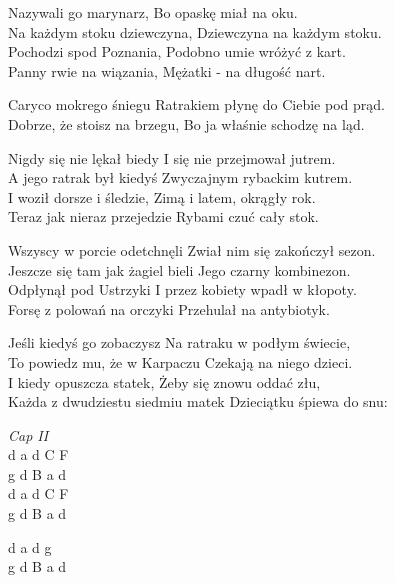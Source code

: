 \begin{text}
    \ifOneCol \else \footnotesize{ \fi
    \ifchorded{\hfill\break}
    Nazywali go marynarz, Bo opaskę miał na oku.\\
    Na każdym stoku dziewczyna,  Dziewczyna na każdym stoku.\\
    Pochodzi spod Poznania, Podobno umie wróżyć z kart.\\
    Panny rwie na wiązania, Mężatki - na długość nart.

    Caryco mokrego śniegu Ratrakiem płynę do Ciebie pod prąd.\\
    Dobrze, że stoisz na brzegu, Bo ja właśnie schodzę na ląd.

    Nigdy się nie lękał biedy I się nie przejmował jutrem.\\
    A jego ratrak był kiedyś Zwyczajnym rybackim kutrem.\\
    I woził dorsze i śledzie, Zimą i latem, okrągły rok.\\
    Teraz jak nieraz przejedzie Rybami czuć cały stok.

    Wszyscy w porcie odetchnęli Zwiał nim się zakończył sezon.\\
    Jeszcze się tam jak żagiel bieli Jego czarny kombinezon.\\
    Odpłynął pod Ustrzyki I przez kobiety wpadł w kłopoty.\\
    Forsę z polowań na orczyki Przehulał na antybiotyk.

    Jeśli kiedyś go zobaczysz Na ratraku w podłym świecie,\\
    To powiedz mu, że w Karpaczu Czekają na niego dzieci.\\
    I kiedy opuszcza statek, Żeby się znowu oddać złu,\\
    Każda z dwudziestu siedmiu matek Dzieciątku śpiewa do snu:
    \ifOneCol \else } \fi
\end{text}
\begin{chord}
    \ifOneCol \else \footnotesize{ \fi
    \textit{Cap II}\\
    d a d C F\\
    g d B a d\\
    d a d C F\\
    g d B a d

    d a d g\\
    g d B a d
    \ifOneCol \else } \fi
\end{chord}